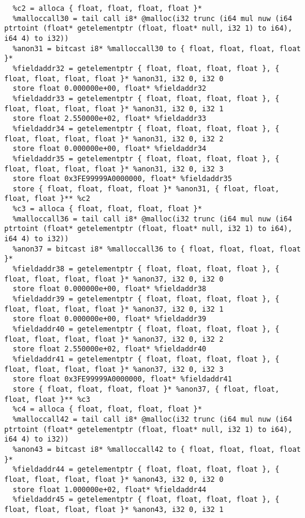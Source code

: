 \documentclass[main.tex]{subfiles}
\begin{document}
{\begin{lstlisting}
  %c2 = alloca { float, float, float, float }*
  %malloccall30 = tail call i8* @malloc(i32 trunc (i64 mul nuw (i64 ptrtoint (float* getelementptr (float, float* null, i32 1) to i64), i64 4) to i32))
  %anon31 = bitcast i8* %malloccall30 to { float, float, float, float }*
  %fieldaddr32 = getelementptr { float, float, float, float }, { float, float, float, float }* %anon31, i32 0, i32 0
  store float 0.000000e+00, float* %fieldaddr32
  %fieldaddr33 = getelementptr { float, float, float, float }, { float, float, float, float }* %anon31, i32 0, i32 1
  store float 2.550000e+02, float* %fieldaddr33
  %fieldaddr34 = getelementptr { float, float, float, float }, { float, float, float, float }* %anon31, i32 0, i32 2
  store float 0.000000e+00, float* %fieldaddr34
  %fieldaddr35 = getelementptr { float, float, float, float }, { float, float, float, float }* %anon31, i32 0, i32 3
  store float 0x3FE99999A0000000, float* %fieldaddr35
  store { float, float, float, float }* %anon31, { float, float, float, float }** %c2
  %c3 = alloca { float, float, float, float }*
  %malloccall36 = tail call i8* @malloc(i32 trunc (i64 mul nuw (i64 ptrtoint (float* getelementptr (float, float* null, i32 1) to i64), i64 4) to i32))
  %anon37 = bitcast i8* %malloccall36 to { float, float, float, float }*
  %fieldaddr38 = getelementptr { float, float, float, float }, { float, float, float, float }* %anon37, i32 0, i32 0
  store float 0.000000e+00, float* %fieldaddr38
  %fieldaddr39 = getelementptr { float, float, float, float }, { float, float, float, float }* %anon37, i32 0, i32 1
  store float 0.000000e+00, float* %fieldaddr39
  %fieldaddr40 = getelementptr { float, float, float, float }, { float, float, float, float }* %anon37, i32 0, i32 2
  store float 2.550000e+02, float* %fieldaddr40
  %fieldaddr41 = getelementptr { float, float, float, float }, { float, float, float, float }* %anon37, i32 0, i32 3
  store float 0x3FE99999A0000000, float* %fieldaddr41
  store { float, float, float, float }* %anon37, { float, float, float, float }** %c3
  %c4 = alloca { float, float, float, float }*
  %malloccall42 = tail call i8* @malloc(i32 trunc (i64 mul nuw (i64 ptrtoint (float* getelementptr (float, float* null, i32 1) to i64), i64 4) to i32))
  %anon43 = bitcast i8* %malloccall42 to { float, float, float, float }*
  %fieldaddr44 = getelementptr { float, float, float, float }, { float, float, float, float }* %anon43, i32 0, i32 0
  store float 1.000000e+02, float* %fieldaddr44
  %fieldaddr45 = getelementptr { float, float, float, float }, { float, float, float, float }* %anon43, i32 0, i32 1

\end{lstlisting}}
\end{document}
